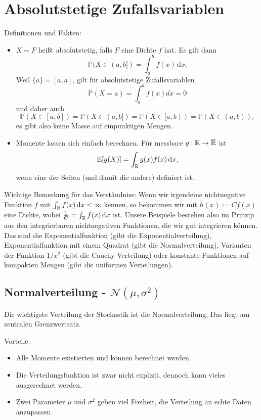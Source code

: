 \documentclass[11pt, a4paper]{book}
\newcommand{\dint}{\, \mathrm{d}}
\begin{document}
\section{Absolutstetige Zufallsvariablen}
Definitionen und Fakten:
\begin{itemize}
	\item $X\sim F$ hei\ss t absolutstetig, falls $F$ eine Dichte $f$ hat. Es gilt dann $$\mathbb P(X\in (a,b])=\int_a^b f(x)\dint x.$$
	Weil $\{a\}=[a,a]$, gilt  f\"ur absolutstetige Zufallsvariablen $$\mathbb P(X=a)=\int_a^a f(x)dx=0$$ und daher auch 
 	$$ \mathbb P(X\in [a,b])=\mathbb P(X\in (a,b])=\mathbb P(X\in [a,b))=\mathbb P(X\in (a,b)),$$
	es gibt also keine Masse auf einpunktigen Mengen.
	\item Momente lassen sich einfach berechnen. F\"ur messbare $g:\mathbb{R}\to \overline {\mathbb{R}}$ ist
	\begin{align*}
		\E[g(X)]=\int_\R g(x) f(x) \dint x,
	\end{align*}
	wenn eine der Seiten (und damit die andere) definiert ist.
\end{itemize}

Wichtige Bemerkung f\"ur das Verst\"andniss: Wenn wir irgendeine nichtnegative Funktion $f$ mit $\int_\R f(x)\dint x<\infty$ kennen, so bekommen wir mit $h(x):= C f(x)$ eine Dichte, wobei $\frac 1 C=\int_\R f(x)\dint x$ ist. Unsere Beispiele bestehen also im Prinzip aus den integrierbaren nichtnegativen Funktionen, die wir gut integrieren k\"onnen. Das sind die Exponentialfunktion (gibt die Exponentialverteilung), Exponentialfunktion mit einem Quadrat (gibt die Normalverteilung), Varianten der Funktion $1/x^2$ (gibt die Cauchy Verteilung) oder konstante Funktionen auf kompakten Mengen (gibt die uniformen Verteilungen).

\subsection{Normalverteilung - $\mathcal N(\mu,\sigma^2)$}
Die wichtigste Verteilung der Stochastik ist die Normalverteilung. Das liegt am zentralen Grenzwertsatz. \smallskip

{Vorteile:} 
\begin{itemize}
\item Alle Momente existierten und k\"onnen berechnet werden.
\item Die Verteilungsfunktion ist zwar nicht explizit, dennoch kann vieles ausgerechnet werden.
\item	Zwei Parameter $\mu$ und $\sigma^2$ geben viel Freiheit, die Verteilung an echte Daten anzupassen.
\end{itemize}
\end{document}
